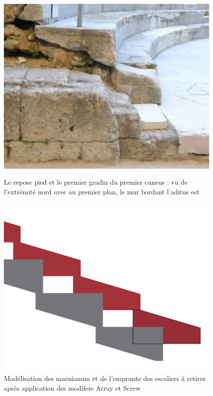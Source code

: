 \begin{figure}[!h] 
	\begin{subfigureth}{0.49\textwidth}
		\includegraphics[scale=0.35]{images/gradinCoupe}
		\caption[Repose pied et premier gradin du premier \gls{cuneus}]{Le repose pied et le premier gradin du premier \gls{cuneus} : vu de l'extrémité nord avec au premier plan, le mur bordant l'\gls{aditus} est} 
		\label{coupeGradin} 		
	\end{subfigureth}	
	\begin{subfigureth}{0.49\textwidth}
		\includegraphics[scale=0.2]{images/escaliers}
		\caption[Modélisation des \gls{maenianum}]{Modélisation des \gls{maenianum} et de l'emprunte des escaliers à retirer après application des modifers Array et Screw}
		\label{modelMaenianum} 		
	\end{subfigureth}	
\end{figure}

